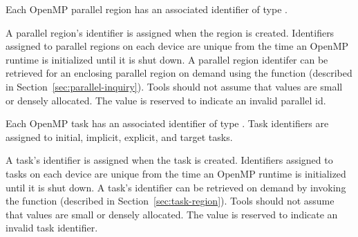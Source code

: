 Each OpenMP parallel region has an associated identifier of type
.
\begin{comment}
\begin{boxedcode}
typedef uint64\_t ompt\_parallel\_id\_t;
\end{boxedcode}
\end{comment}
  A parallel region's identifier is assigned
  when the region is created.  Identifiers assigned to parallel regions on each device are unique from the time an
  OpenMP runtime is initialized until it is shut down.
  A parallel region identifer can be retrieved for an enclosing parallel region
  on demand using the function   (described in Section~\ref{sec:parallel-inquiry}).
  Tools should not assume that  values are small or densely allocated.
  The value  is reserved to indicate an invalid parallel id.


Each OpenMP task has an associated identifier of type
. Task identifiers are assigned to
initial, implicit, explicit, and target tasks.
\begin{comment}
\begin{boxedcode}
typedef uint64\_t ompt\_task\_id\_t;
\end{boxedcode}
\end{comment}
  A task's identifier is assigned
  when the task is created.
  Identifiers assigned to tasks on each device are unique from the time an
  OpenMP runtime is initialized until it is shut down.
  A task's identifier can be retrieved
  on demand by invoking the   function (described in Section~\ref{sec:task-region}).
  Tools should not assume that  values are small or densely allocated.
  The value  is reserved to indicate an invalid task identifier.

